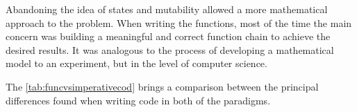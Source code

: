 Abandoning the idea of states and mutability allowed a more mathematical approach to the problem. When writing the functions, most of the time the main concern was building a meaningful and correct function chain to achieve the desired results. It was analogous to the process of developing a mathematical model to an experiment, but in the level of computer science.

The \cref{tab:funcvsimperativecod} brings a comparison between the principal differences found when writing code in both of the paradigms.

\begin{table}[H]
\caption{Code comparison: Imperative and Functional paradigms}
\label{tab:funcvsimperativecod}
\end{table}